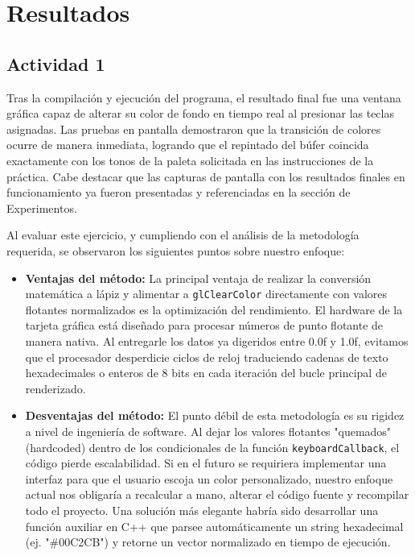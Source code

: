 \section{Resultados}

\subsection{Actividad 1}

Tras la compilación y ejecución del programa, el resultado final fue una ventana gráfica capaz de alterar su color de fondo en tiempo real al presionar las teclas asignadas. Las pruebas en pantalla demostraron que la transición de colores ocurre de manera inmediata, logrando que el repintado del búfer coincida exactamente con los tonos de la paleta solicitada en las instrucciones de la práctica. Cabe destacar que las capturas de pantalla con los resultados finales en funcionamiento ya fueron presentadas y referenciadas en la sección de Experimentos.

Al evaluar este ejercicio, y cumpliendo con el análisis de la metodología requerida, se observaron los siguientes puntos sobre nuestro enfoque:

\begin{itemize}
    \item \textbf{Ventajas del método:} La principal ventaja de realizar la conversión matemática a lápiz y alimentar a \texttt{glClearColor} directamente con valores flotantes normalizados es la optimización del rendimiento. El hardware de la tarjeta gráfica está diseñado para procesar números de punto flotante de manera nativa. Al entregarle los datos ya digeridos entre 0.0f y 1.0f, evitamos que el procesador desperdicie ciclos de reloj traduciendo cadenas de texto hexadecimales o enteros de 8 bits en cada iteración del bucle principal de renderizado.
    \item \textbf{Desventajas del método:} El punto débil de esta metodología es su rigidez a nivel de ingeniería de software. Al dejar los valores flotantes "quemados" (hardcoded) dentro de los condicionales de la función \texttt{keyboardCallback}, el código pierde escalabilidad. Si en el futuro se requiriera implementar una interfaz para que el usuario escoja un color personalizado, nuestro enfoque actual nos obligaría a recalcular a mano, alterar el código fuente y recompilar todo el proyecto. Una solución más elegante habría sido desarrollar una función auxiliar en C++ que parsee automáticamente un string hexadecimal (ej. "\#00C2CB") y retorne un vector normalizado en tiempo de ejecución.
\end{itemize}

